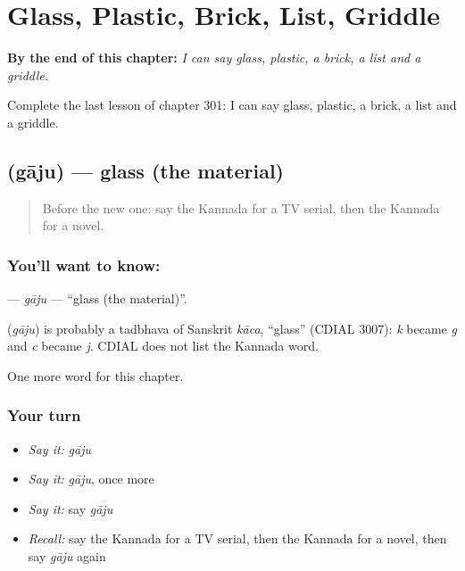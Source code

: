 
\chapter{Glass, Plastic, Brick, List, Griddle}
\label{ch:ka-glass-plastic-brick-list-griddle}

\begin{chapteropening}
\textbf{By the end of this chapter:} \emph{I can say glass, plastic, a brick, a list and a griddle.}

Complete the last lesson of chapter 301: I can say glass, plastic, a brick, a list and a griddle.
\end{chapteropening}

\section[\texorpdfstring{\kn{ಗಾಜು} (gāju)}{ಗಾಜು (gāju)}]{ (gāju) — glass (the material)}

\label{lesson:KA-C301-gaju}



\begin{quote}
Before the new one: say the Kannada for a TV serial, then the Kannada for a novel.
\end{quote}

\subsection*{You'll want to know: }
\textbf{} — \emph{gāju} — \textquotedblleft{}glass (the material)\textquotedblright{}.

\begin{cousinweb}
\textbf{} (\emph{gāju}) is probably a tadbhava of Sanskrit \emph{kāca}, \textquotedblleft{}glass\textquotedblright{} (CDIAL 3007): \emph{k} became \emph{g} and \emph{c} became \emph{j}. CDIAL does not list the Kannada word.
\end{cousinweb}

\begin{grammarlens}[title={What you've built}]
One more word for this chapter.
\end{grammarlens}

\subsection*{Your turn}
\begin{itemize}
\raggedright
  \item \emph{Say it:} \emph{gāju}
  \item \emph{Say it:} \emph{gāju}, once more
  \item \emph{Say it:} say \emph{gāju}
  \item \emph{Recall:} say the Kannada for a TV serial, then the Kannada for a novel, then say \emph{gāju} again
\end{itemize}

